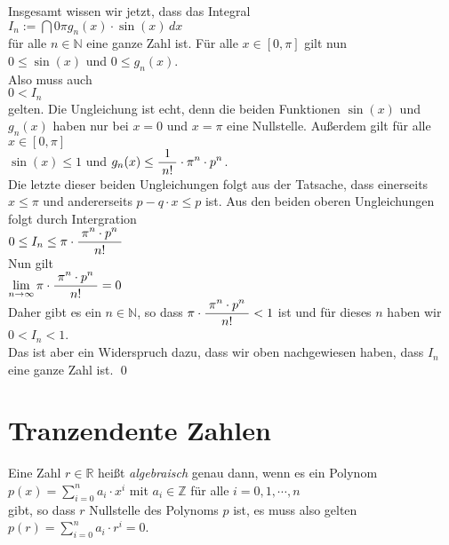 Insgesamt wissen wir jetzt, dass das Integral
\\[0.2cm]
\hspace*{1.3cm}
$I_n := \dint{0}{{\pi}} g_n(x) \cdot \sin(x)\, dx$
\\[0.2cm]
f\"ur alle $n \in \mathbb{N}$ eine ganze Zahl ist.  F\"ur alle $x \in [0, \pi]$ gilt nun
\\[0.2cm]
\hspace*{1.3cm}
$0 \leq \sin(x)$ \quad und \quad $0 \leq g_n(x)$.
\\[0.2cm]
Also muss auch
\\[0.2cm]
\hspace*{1.3cm}
$0 < I_n$
\\[0.2cm]
gelten.  Die Ungleichung ist echt, denn die beiden Funktionen $\sin(x)$ und $g_n(x)$ haben
nur bei $x = 0$ und $x = \pi$ eine Nullstelle.
Au{\ss}erdem gilt f\"ur alle $x \in [0,\pi]$
\\[0.2cm]
\hspace*{1.3cm}
$\sin(x) \leq 1$ \quad und \quad $g_n(x) \leq \displaystyle\frac{\;\displaystyle1\;}{\;\displaystyle n!\;} \cdot \pi^n \cdot p^n$.
\\[0.2cm]
Die letzte dieser beiden Ungleichungen folgt aus der Tatsache, dass einerseits $x \leq \pi$ und andererseits
$p - q\cdot x \leq p$ ist.  Aus den beiden oberen Ungleichungen folgt durch Intergration
\\[0.2cm]
\hspace*{1.3cm}
$0 \leq I_n \leq \pi \cdot \displaystyle\frac{\;\displaystyle\pi^n \cdot p^n\;}{\;\displaystyle n!\;}$
\\[0.2cm]
Nun gilt
\\[0.2cm]
\hspace*{1.3cm}
$\lim\limits_{n \rightarrow \infty} \pi \cdot \displaystyle\frac{\;\displaystyle\pi^n \cdot p^n\;}{\;\displaystyle n!\;} = 0$
\\[0.2cm]
Daher gibt es ein $n \in \mathbb{N}$, so dass $\pi \cdot \displaystyle\frac{\;\displaystyle\pi^n \cdot p^n\;}{\;\displaystyle n!\;} < 1$ ist und f\"ur dieses
$n$ haben wir 
\\[0.2cm]
\hspace*{1.3cm}
$0 < I_n < 1$.
\\[0.2cm]
Das ist aber ein Widerspruch dazu, dass wir oben nachgewiesen haben, dass $I_n$ eine ganze Zahl ist.  \qed

\section{Tranzendente Zahlen}
\begin{Definition} \lb
Eine Zahl $r \in \mathbb{R}$ hei{\ss}t \emph{algebraisch} genau dann, wenn es ein Polynom
\\[0.2cm]
\hspace*{1.3cm}
$p(x) = \sum\limits_{i=0}^n a_i \cdot x^i$  \quad mit $a_i \in \mathbb{Z}$ f\"ur alle $i = 0, 1, \cdots, n$
\\[0.2cm]
gibt, so dass $r$ Nullstelle des Polynoms $p$ ist, es muss also gelten
\\[0.2cm]
\hspace*{1.3cm}
$p(r) = \sum\limits_{i=0}^n a_i \cdot r^i = 0$.  \eod
\end{Definition}

